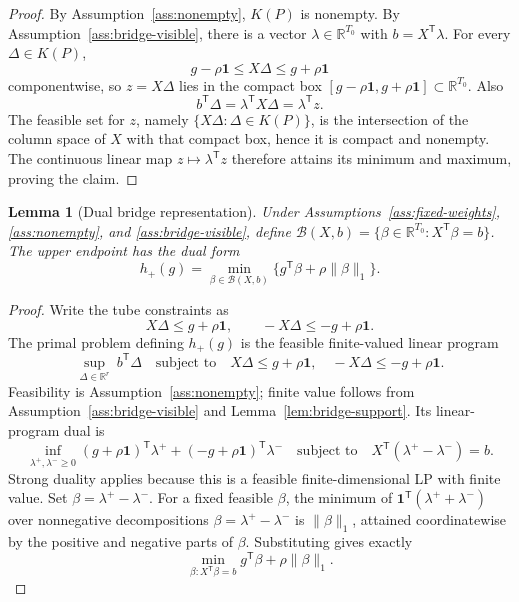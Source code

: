 \documentclass[11pt]{article}
\newcommand{\one}{\mathbf{1}}
\newcommand{\transpose}{\mathsf{T}}
\newcommand{\R}{\mathbb{R}}
\theoremstyle{definition}
\theoremstyle{plain}
\newtheorem{lemma}{Lemma}
\theoremstyle{remark}
\begin{document}
\begin{proof}
By Assumption~\ref{ass:nonempty}, \(K(P)\) is nonempty.  By
Assumption~\ref{ass:bridge-visible}, there is a vector
\(\lambda\in\R^{T_0}\) with \(b=X^\transpose\lambda\).  For every
\(\Delta\in K(P)\),
\[
g-\rho\one\le X\Delta\le g+\rho\one
\]
componentwise, so \(z=X\Delta\) lies in the compact box
\([g-\rho\one,g+\rho\one]\subset\R^{T_0}\).  Also
\[
b^\transpose\Delta=\lambda^\transpose X\Delta=\lambda^\transpose z.
\]
The feasible set for \(z\), namely
\(\{X\Delta:\Delta\in K(P)\}\), is the intersection of the column space of
\(X\) with that compact box, hence it is compact and nonempty.  The continuous
linear map \(z\mapsto\lambda^\transpose z\) therefore attains its minimum and
maximum, proving the claim.
\end{proof}

\begin{lemma}[Dual bridge representation]\label{lem:dual-bridge}
Under Assumptions~\ref{ass:fixed-weights}, \ref{ass:nonempty}, and
\ref{ass:bridge-visible}, define
\(\mathcal B(X,b)=\{\beta\in\R^{T_0}:X^\transpose\beta=b\}\).  The upper
endpoint has the dual form
\[
h_+(g)=\min_{\beta\in\mathcal B(X,b)}
\{g^\transpose\beta+\rho\|\beta\|_1\}.
\]
\end{lemma}

\begin{proof}
Write the tube constraints as
\[
X\Delta\le g+\rho\one,\qquad -X\Delta\le -g+\rho\one .
\]
The primal problem defining \(h_+(g)\) is the feasible finite-valued linear
program
\[
\sup_{\Delta\in\R^r}\ b^\transpose\Delta
\quad\text{subject to}\quad
X\Delta\le g+\rho\one,\quad -X\Delta\le -g+\rho\one .
\]
Feasibility is Assumption~\ref{ass:nonempty}; finite value follows from
Assumption~\ref{ass:bridge-visible} and Lemma~\ref{lem:bridge-support}.  Its
linear-program dual is
\[
\inf_{\lambda^+,\lambda^-\ge0}
(g+\rho\one)^\transpose\lambda^+
{}+
(-g+\rho\one)^\transpose\lambda^-
\quad\text{subject to}\quad
X^\transpose(\lambda^+-\lambda^-)=b .
\]
Strong duality applies because this is a feasible finite-dimensional LP with
finite value.  Set \(\beta=\lambda^+-\lambda^-\).  For a fixed feasible
\(\beta\), the minimum of \(\one^\transpose(\lambda^++\lambda^-)\) over
nonnegative decompositions \(\beta=\lambda^+-\lambda^-\) is
\(\|\beta\|_1\), attained coordinatewise by the positive and negative parts of
\(\beta\).  Substituting gives exactly
\[
\min_{\beta:X^\transpose\beta=b}
g^\transpose\beta+\rho\|\beta\|_1 .
\]
\end{proof}
\end{document}
